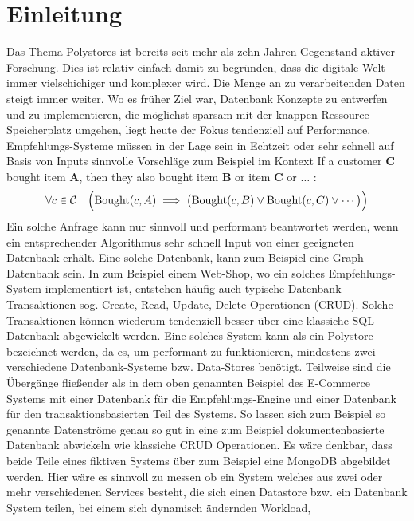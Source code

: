 

\chapter{Einleitung}
\label{ch:intro}
Das Thema Polystores ist bereits seit mehr als zehn Jahren Gegenstand aktiver Forschung. 
Dies ist relativ einfach damit zu begründen, dass die digitale Welt immer vielschichiger und komplexer wird.
Die Menge an zu verarbeitenden Daten steigt immer weiter. Wo es früher Ziel war, Datenbank Konzepte
zu entwerfen und zu implementieren, die möglichst sparsam mit der knappen Ressource Speicherplatz
umgehen, liegt heute der Fokus tendenziell auf Performance.
Empfehlungs-Systeme müssen in der Lage sein in Echtzeit oder sehr schnell auf Basis von Inputs
sinnvolle Vorschläge zum Beispiel im Kontext If a customer $\mathbf{C}$ bought item $\mathbf{A}$, then they also bought item $\mathbf{B}$ or item $\mathbf{C}$ or $\ldots$
:
\[
\forall c \in \mathcal{C} \quad \Bigl( \text{Bought}(c, A) \implies \bigl( \text{Bought}(c, B) \lor \text{Bought}(c, C) \lor \cdots \bigr) \Bigr)
\]
Ein solche Anfrage kann nur sinnvoll und performant beantwortet werden, 
wenn ein entsprechender Algorithmus sehr schnell Input von einer geeigneten
Datenbank erhält. Eine solche Datenbank, kann zum Beispiel eine Graph-Datenbank sein.
In zum Beispiel einem Web-Shop, wo ein solches Empfehlungs-System implementiert ist, entstehen
häufig auch typische Datenbank Transaktionen sog. Create, Read, Update, Delete Operationen (CRUD).
Solche Transaktionen können wiederum tendenziell besser über eine klassiche SQL Datenbank 
abgewickelt werden.
Eine solches System kann als ein Polystore bezeichnet werden, da es, um performant zu funktionieren,
mindestens zwei verschiedene Datenbank-Systeme bzw. Data-Stores benötigt.
Teilweise sind die Übergänge fließender als in dem oben genannten Beispiel des E-Commerce Systems 
mit einer Datenbank für die Empfehlungs-Engine und einer Datenbank für den transaktionsbasierten 
Teil des Systems.
So lassen sich zum Beispiel so genannte Datenströme genau so gut in eine zum Beispiel
dokumentenbasierte Datenbank abwickeln wie klassiche CRUD Operationen. Es wäre denkbar, dass beide
Teile eines fiktiven Systems über zum Beispiel eine MongoDB abgebildet werden.
Hier wäre es sinnvoll zu messen ob ein System welches aus zwei oder mehr verschiedenen Services besteht,
die sich einen Datastore bzw. ein Datenbank System teilen, bei einem sich dynamisch ändernden Workload,

